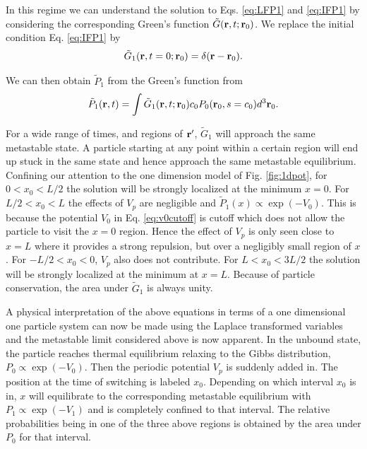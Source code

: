 \documentclass[journal = mamobx, manuscript = article]{achemso}
\def\br{{\bf r}}
\begin{document}
In this regime we can understand the solution to  Eqs. \ref{eq:LFP1} and \ref{eq:IFP1} 
by considering the corresponding Green's function $\tilde{G}(\br,t;\br_0)$. We replace the initial
condition Eq. \ref{eq:IFP1} by 
\begin{equation}
\label{eq:GIFP} 
\tilde{G}_1(\br,t=0;\br_0) = \delta(\br-\br_0) . 
\end{equation}

We can then obtain $\tilde{P}_1$ from the Green's function from
\begin{equation}
\label{eq:P1intGP0}
\tilde{P}_1(\br,t) = \int \tilde{G}_1(\br,t;\br_0) c_0 P_0(\br_0, s = c_0) d^3\br_0 .
\end{equation}

For a wide range of times, and regions of $\br'$, $\tilde{G}_1$ will approach the same
metastable state. A particle starting at any point within a certain region will
end up stuck in the same state and hence approach the same metastable equilibrium. 
Confining our attention to the one dimension model of Fig.
\ref{fig:1dpot}, for $0 < x_0 < L/2$ the solution will be strongly localized at
the minimum $x=0$. For $L/2 < x_0 < L$ the effects of $V_p$ are negligible
and $\tilde{P}_1(x) \propto \exp(-V_0)$. This is because the potential $V_0$ 
in Eq. \ref{eq:v0cutoff} is cutoff which does not allow the particle to visit
the $x=0$ region. Hence the effect of $V_p$ is only seen close to $x=L$ where
it provides a strong repulsion, but over a negligibly small region of $x$.
For $-L/2 < x_0 < 0$, $V_p$ also does not contribute.
For $L < x_0 < 3L/2$ the solution will be strongly localized at
the minimum at $x=L$. Because of particle conservation, the area under
$\tilde{G}_1$ is always unity.

A physical interpretation of the above equations in terms of a one dimensional one particle system 
can now be made using the Laplace transformed
variables and the metastable limit considered above is now apparent.
In the unbound state, the
particle reaches thermal equilibrium relaxing to the Gibbs
distribution, $P_0 \propto \exp(-V_0)$. Then the periodic potential $V_p$ is suddenly
added in. The position at the time of switching is labeled $x_0$. Depending
on which interval $x_0$ is in, $x$ will equilibrate to the corresponding
metastable equilibrium with $P_1 \propto \exp(-V_1)$ and is completely confined to
that interval. The relative probabilities
being in one of the three above regions is obtained by the area under $P_0$ for
that interval.
\end{document}
